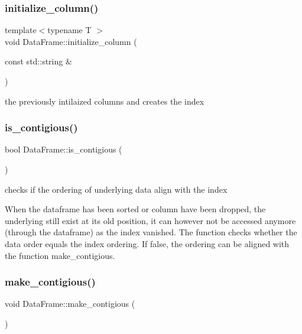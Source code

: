 \subsubsection{\texorpdfstring{initialize\+\_\+column()}{initialize\_column()}}
{\footnotesize\ttfamily template$<$typename T $>$ \\
void Data\+Frame\+::initialize\+\_\+column (\begin{DoxyParamCaption}\item[{const std\+::string \&}]{ }\end{DoxyParamCaption})\hspace{0.3cm}{\ttfamily [private]}}

the previously intilaized columns and creates the index \mbox{\label{classDataFrame_a40f6420c823601946d56ba625484a74e}} 
\subsubsection{\texorpdfstring{is\+\_\+contigious()}{is\_contigious()}}
{\footnotesize\ttfamily bool Data\+Frame\+::is\+\_\+contigious (\begin{DoxyParamCaption}{ }\end{DoxyParamCaption})}



checks if the ordering of underlying data align with the index 

When the dataframe has been sorted or column have been dropped, the underlying still exist at its old position, it can however not be accessed anymore (through the dataframe) as the index vanished. The function checks whether the data order equals the index ordering. If false, the ordering can be aligned with the function {\ttfamily make\+\_\+contigious}. \mbox{\label{classDataFrame_a7a1b7c79f2b98e18ed5cda2852dd5341}} 
\subsubsection{\texorpdfstring{make\+\_\+contigious()}{make\_contigious()}}
{\footnotesize\ttfamily void Data\+Frame\+::make\+\_\+contigious (\begin{DoxyParamCaption}{ }\end{DoxyParamCaption})}



